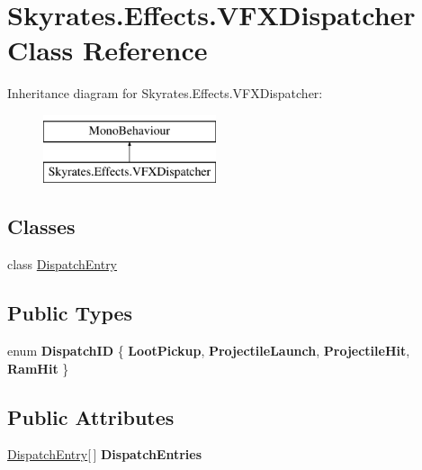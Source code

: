 \hypertarget{class_skyrates_1_1_effects_1_1_v_f_x_dispatcher}{\section{Skyrates.\-Effects.\-V\-F\-X\-Dispatcher Class Reference}
\label{class_skyrates_1_1_effects_1_1_v_f_x_dispatcher}
}
Inheritance diagram for Skyrates.\-Effects.\-V\-F\-X\-Dispatcher\-:\begin{figure}[H]
\begin{center}
\leavevmode
\includegraphics[height=2.000000cm]{class_skyrates_1_1_effects_1_1_v_f_x_dispatcher}
\end{center}
\end{figure}
\subsection*{Classes}
\begin{DoxyCompactItemize}
\item 
class \hyperlink{class_skyrates_1_1_effects_1_1_v_f_x_dispatcher_1_1_dispatch_entry}{Dispatch\-Entry}
\end{DoxyCompactItemize}
\subsection*{Public Types}
\begin{DoxyCompactItemize}
\item 
enum {\bfseries Dispatch\-I\-D} \{ {\bfseries Loot\-Pickup}, 
{\bfseries Projectile\-Launch}, 
{\bfseries Projectile\-Hit}, 
{\bfseries Ram\-Hit}
 \}
\end{DoxyCompactItemize}
\subsection*{Public Attributes}
\begin{DoxyCompactItemize}
\item 
\hypertarget{class_skyrates_1_1_effects_1_1_v_f_x_dispatcher_ad0f1ceb66dd0a3706017ca015ae83946}{\hyperlink{class_skyrates_1_1_effects_1_1_v_f_x_dispatcher_1_1_dispatch_entry}{Dispatch\-Entry}\mbox{[}$\,$\mbox{]} {\bfseries Dispatch\-Entries}}\label{class_skyrates_1_1_effects_1_1_v_f_x_dispatcher_ad0f1ceb66dd0a3706017ca015ae83946}

\end{DoxyCompactItemize}
